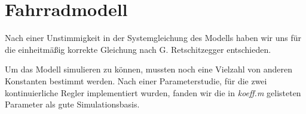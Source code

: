 \documentclass[a4paper]{article}
\begin{document}
\section{Fahrradmodell}

Nach einer Unstimmigkeit in der Systemgleichung des Modells haben wir uns für die einheitmäßig korrekte Gleichung nach G. Retschitzegger entschieden.

Um das Modell simulieren zu können, mussten noch eine Vielzahl von anderen Konstanten bestimmt werden. Nach einer Parameterstudie, für die zwei kontinuierliche Regler implementiert wurden, fanden wir die in \emph{koeff.m} gelisteten Parameter als gute Simulationsbasis.
\end{document}
